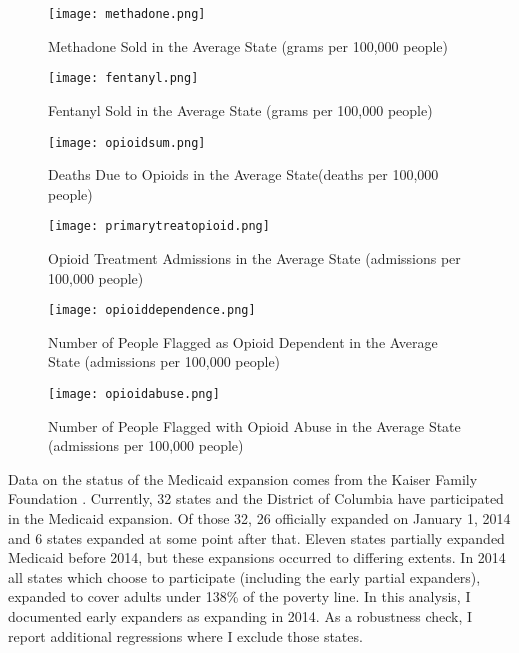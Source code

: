 \documentclass[11pt]{article}
\begin{document}
\begin{figure} 
\begin{center}
  \texttt{[image: methadone.png]}
  \caption{Methadone Sold in the Average State (grams per 100,000 people)}
  \label{Methadone}
   \end{center}
\end{figure}

\begin{figure} 
\begin{center}
  \texttt{[image: fentanyl.png]}
  \caption{Fentanyl Sold in the Average State (grams per 100,000 people)}
  \label{Fenanyl}
   \end{center}
\end{figure}

\begin{figure} 
\begin{center}
  \texttt{[image: opioidsum.png]}
  \caption{Deaths Due to Opioids in the Average State(deaths per 100,000 people)}
  \label{Deaths}
   \end{center}
\end{figure}

\begin{figure}
\begin{center} 
  \texttt{[image: primarytreatopioid.png]}
  \label{primary}
  \caption{Opioid Treatment Admissions in the Average State (admissions per 100,000 people)}
   \end{center}
\end{figure}

\begin{figure} 
\begin{center}
  \texttt{[image: opioiddependence.png]}
  \caption{Number of People Flagged as Opioid Dependent in the Average State (admissions per 100,000 people)}
   \label{dependence}
    \end{center}
\end{figure}


\begin{figure} 
\begin{center}
  \texttt{[image: opioidabuse.png]}
  \caption{Number of People Flagged with Opioid Abuse in the Average State (admissions per 100,000 people)}
  \label{Abuse}
  \end{center}
\end{figure}

\cleardoublepage


Data on the status of the Medicaid expansion comes from the Kaiser Family Foundation \citep{TheHenryJ.KaiserFamilyFoundation2017}.  Currently, 32 states and the District of Columbia have participated in the Medicaid expansion.  Of those 32, 26 officially expanded on January 1, 2014 and 6 states expanded at some point after that. Eleven states partially expanded Medicaid before 2014, but these expansions occurred to differing extents.  In 2014 all states which choose to participate (including the early partial expanders), expanded to cover adults under 138\% of the poverty line.  In this analysis, I documented early expanders as expanding in 2014.  As a robustness check, I report additional regressions where I exclude those states.  
\end{document}
